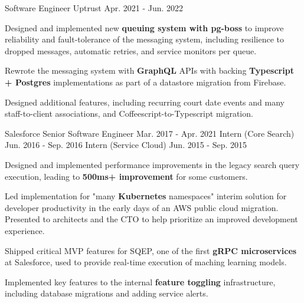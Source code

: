 
\begin{cventries}

  \cventry
    {Software Engineer} %
    {Uptrust} %
    {} %
    {Apr. 2021 - Jun. 2022} %
    {
      \begin{cvitems} %
        \item {Designed and implemented new \textbf{queuing system with pg-boss} to improve reliability and fault-tolerance of the messaging system, including resilience to dropped messages, automatic retries, and service monitors per queue.}
        \item {Rewrote the messaging system with \textbf{GraphQL} APIs with backing \textbf{Typescript + Postgres} implementations as part of a datastore migration from Firebase.}
        \item {Designed additional features, including recurring court date events and many staff-to-client associations, and Coffeescript-to-Typescript migration.}
      \end{cvitems}
    }
    
  \cvthreeentry
    {Salesforce} %
    {} %
    {Senior Software Engineer}
    {Mar. 2017 - Apr. 2021}
    {Intern (Core Search)}
    {Jun. 2016 - Sep. 2016}
    {Intern (Service Cloud)}
    {Jun. 2015 - Sep. 2015}
    {
      \begin{cvitems} %
        \item {Designed and implemented performance improvements in the legacy search query execution, leading to \textbf{500ms+ improvement} for some customers.}
        \item {Led implementation for "many \textbf{Kubernetes} namespaces" interim solution for developer productivity in the early days of an AWS public cloud migration. Presented to architects and the CTO to help prioritize an improved development experience.}
        \item {Shipped critical MVP features for SQEP, one of the first \textbf{gRPC microservices} at Salesforce, used to provide real-time execution of maching learning models.}
        \item {Implemented key features to the internal \textbf{feature toggling} infrastructure, including database migrations and adding service alerts.}
      \end{cvitems}
    }
    

\end{cventries}
